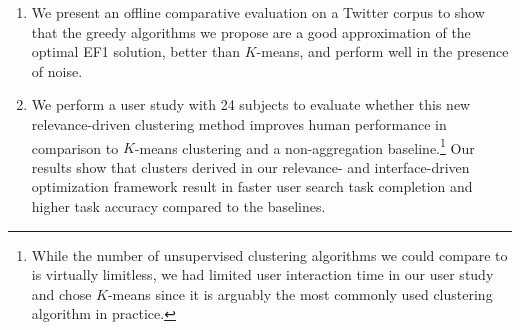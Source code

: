 \begin{enumerate}[topsep=0pt,leftmargin=*]
\item We present an offline comparative evaluation on a Twitter corpus to show that the greedy algorithms we propose are a good approximation of the optimal EF1 solution, better than $K$-means, and perform well in the presence of noise.%
\item We perform a user study with 24 subjects to evaluate whether this new relevance-driven clustering method improves human performance in comparison to $K$-means clustering and a non-aggregation baseline.\footnote{While the number of unsupervised clustering algorithms we could compare to is virtually limitless, we had limited user interaction time in our user study and chose $K$-means since it is arguably the most commonly used clustering algorithm in practice.}  Our results show that clusters derived in our relevance- and interface-driven optimization framework result in faster user search task completion and higher task accuracy compared to the baselines.
\end{enumerate}



